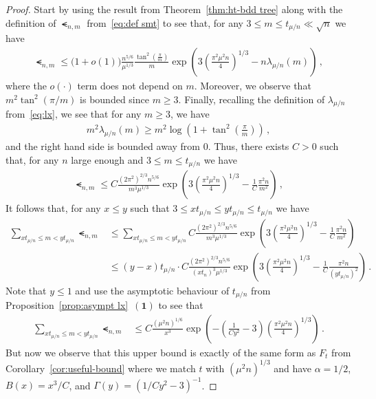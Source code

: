 \documentclass{article}
\newcommand{\1}{\mathbbm{1}}								%
\theoremstyle{definition}
\numberwithin{equation}{section}
\newcommand{\numitem}[1]{$\mathbf{(#1)}$}
\begin{document}
\begin{proof}
    Start by using the result from Theorem~\ref{thm:ht-bdd tree} along with the definition of $\smt_{n,m}$ from~\eqref{eq:def smt} to see that, for any $3\leq m\leq t_{\mu/n}\ll\sqrt{n}$ we have
    \begin{align*}
        \smt_{n,m}\leq\big(1+o(1)\big)\frac{n^{5/6}}{\mu^{1/3}}\frac{\tan^2\left(\frac{\pi}{m}\right)}{m}\exp\left(3\left(\frac{\pi^2\mu^2n}{4}\right)^{1/3}-n\lambda_{\mu/n}(m)\right)\,,
    \end{align*}
    where the $o(\cdot)$ term does not depend on $m$.
    Moreover, we observe that $m^2\tan^2(\pi/m)$ is bounded since $m\geq3$.
    Finally, recalling the definition of $\lambda_{\mu/n}$ from~\eqref{eq:lx}, we see that for any $m\geq3$, we have
    \begin{align*}
        m^2\lambda_{\mu/n}(m)\geq m^2\log\left(1+\tan^2\left(\frac{\pi}{m}\right)\right)\,,
    \end{align*}
    and the right hand side is bounded away from $0$.
    Thus, there exists $C>0$ such that, for any $n$ large enough and $3\leq m\leq t_{\mu/n}$ we have
    \begin{align*}
        \smt_{n,m}\leq C\frac{(2\pi^2)^{2/3}n^{5/6}}{m^3\mu^{1/3}}\exp\left(3\left(\frac{\pi^2\mu^2n}{4}\right)^{1/3}-\frac{1}{C}\frac{\pi^2n}{m^2}\right)\,,
    \end{align*}
    It follows that, for any $x\leq y$ such that $3\leq xt_{\mu/n}\leq yt_{\mu/n}\leq  t_{\mu/n}$ we have
    \begin{align*}
        \sum_{xt_{\mu/n}\leq m<yt_{\mu/n}}\smt_{n,m}&\leq\sum_{xt_{\mu/n}\leq m<yt_{\mu/n}}C\frac{(2\pi^2)^{2/3}n^{5/6}}{m^3\mu^{1/3}}\exp\left(3\left(\frac{\pi^2\mu^2n}{4}\right)^{1/3}-\frac{1}{C}\frac{\pi^2n}{m^2}\right)\\
        &\leq(y-x)t_{\mu/n}\cdot C\frac{(2\pi^2)^{2/3}n^{5/6}}{(xt_n)^3\mu^{1/3}}\exp\left(3\left(\frac{\pi^2\mu^2n}{4}\right)^{1/3}-\frac{1}{C}\frac{\pi^2n}{(yt_{\mu/n})^2}\right)\,.
    \end{align*}
    Note that $y\leq 1$ and use the asymptotic behaviour of $t_{\mu/n}$ from Proposition~\ref{prop:asympt lx}~\numitem{1} to see that
    \begin{align*}
        \sum_{xt_{\mu/n}\leq m<yt_{\mu/n}}\smt_{n,m}&\leq C\frac{(\mu^2n)^{1/6}}{x^3}\exp\left(-\left(\frac{1}{Cy^2}-3\right)\left(\frac{\pi^2\mu^2n}{4}\right)^{1/3}\right)\,.
    \end{align*}
    But now we observe that this upper bound is exactly of the same form as $F_t$ from Corollary~\ref{cor:useful-bound} where we match $t$ with $(\mu^2n)^{1/3}$ and have $\alpha=1/2$, $B(x)=x^3/C$, and $\Gamma(y)=(1/Cy^2-3)^{-1}$.

\end{proof}
\end{document}
